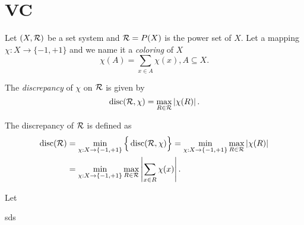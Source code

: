 \section{VC}

\begin{theorem}
   Let $(X, \mathcal{R})$ be a set system and $\mathcal{R} = P(X)$ is the power set of
   $X$. Let a mapping $\chi: X \to \{-1, +1\}$ and we name it a
   \textit{coloring} of $X$
   \begin{equation}
      \chi(A) = \sum_{x\in A} \chi(x), A \subseteq X.
   \end{equation}
   
   The \textit{discrepancy} of $\chi$ on $\mathcal{R}$ is given by 
   \begin{equation}
      \operatorname{disc}(\mathcal{R}, \chi) = \max_{R\in \mathcal{R}} \left| \chi(R) \right|.
   \end{equation}

   The discrepancy of $\mathcal{R}$ is defined as
   \begin{align}
      \operatorname{disc}(\mathcal{R}) 
      &= \min_{\chi: X\to\{-1,+1\}} \Big\{
         \operatorname{disc}(\mathcal{R}, \chi)
      \Big\}
      = \min_{\chi: X\to\{-1,+1\}} \max_{R\in\mathcal{R}} \left| \chi(R) \right| \\
      &= \min_{\chi: X\to\{-1,+1\}} \max_{R\in\mathcal{R}} 
      \left| \sum_{x\in R} \chi(x) \right|.
   \end{align}
\end{theorem}

\begin{definition}[VC-class]
   
\end{definition}

\begin{proposition}
   Let 
\end{proposition}

\begin{theorem}
   \cite[Theorem 1.2, p. 595]{matousekDiscrepancyApproximationsBounded1993}
   \label{thm:coloring_set_bound}
   sds
\end{theorem}


